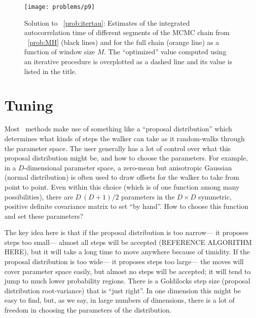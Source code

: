 \documentclass[12pt,twoside,pdftex]{article}
\newcommand{\MCMC}{\acronym{MCMC}}
\begin{document}
\begin{figure}[!htbp]
\begin{center}
\texttt{[image: problems/p9]}
\end{center}
\caption{Solution to \problemname~\ref{prob:itertau}:
Estimates of the integrated autocorrelation time of different segments of the
MCMC chain from \problemname~\ref{prob:MH} (black lines) and for the full
chain (orange line) as a function of window size $M$.
The ``optimized'' value computed using an iterative procedure is overplotted
as a dashed line and its value is listed in the title.}
\label{fig:itertau}
\end{figure}

\section{Tuning}\label{sec:tuning}

Most \MCMC\ methods make use of something like a ``proposal distribution''
  which determines what kinds of steps the walker can take
  as it random-walks through the parameter space.
The user generally has a lot of control over what this proposal distribution might be,
  and how to choose the parameters.
For example, in a $D$-dimensional parameter space, %
  a zero-mean but anisotropic Gaussian (normal distribution)
  is often used to draw offsets for the walker to take from point to point.
Even within this choice (which is of one function among many possibilities),
  there are $D\,(D+1)/2$ parameters in the $D\times D$ symmetric, positive definite covariance matrix
  to set ``by hand''.
How to choose this function and set these parameters?

The key idea here is that if the proposal distribution is too narrow---%
  it proposes steps too small---%
  almost all steps will be accepted (REFERENCE ALGORITHM HERE),
  but it will take a long time to move anywhere because of timidity.
If the proposal distribution is too wide---%
  it proposes steps too large---%
  the moves will cover parameter space easily,
  but almost no steps will be accepted;
  it will tend to jump to much lower probability regions.
There is a Goldilocks step size (proposal distribution root-variance) that is ``just right''.
In one dimension this might be easy to find,
  but, as we say, in large numbers of dimensions,
  there is a lot of freedom in choosing the parameters of the distribution.

\end{document}
